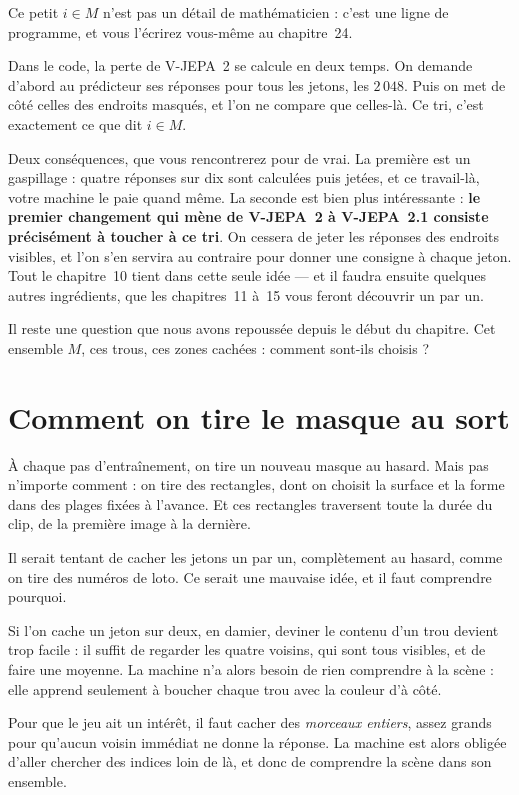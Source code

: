 \begin{enia}
Ce petit $i \in M$ n'est pas un détail de mathématicien : c'est une ligne de
programme, et vous l'écrirez vous-même au chapitre~24.

Dans le code, la perte de V-JEPA~2 se calcule en deux temps. On demande
d'abord au prédicteur ses réponses pour tous les jetons, les $2\,048$. Puis
on met de côté celles des endroits masqués, et l'on ne compare que
celles-là. Ce tri, c'est exactement ce que dit $i \in M$.

Deux conséquences, que vous rencontrerez pour de vrai. La première est un
gaspillage : quatre réponses sur dix sont calculées puis jetées, et ce
travail-là, votre machine le paie quand même. La seconde est bien plus
intéressante : \textbf{le premier changement qui mène de V-JEPA~2 à
V-JEPA~2.1 consiste précisément à toucher à ce tri}. On cessera de jeter les
réponses des endroits visibles, et l'on s'en servira au contraire pour
donner une consigne à chaque jeton. Tout le chapitre~10 tient dans cette
seule idée — et il faudra ensuite quelques autres ingrédients, que les
chapitres~11 à~15 vous feront découvrir un par un.
\end{enia}

Il reste une question que nous avons repoussée depuis le début du chapitre.
Cet ensemble $M$, ces trous, ces zones cachées : comment sont-ils choisis ?

\section{Comment on tire le masque au sort}

\begin{enclair}
À chaque pas d'entraînement, on tire un nouveau masque au hasard. Mais pas
n'importe comment : on tire des rectangles, dont on choisit la surface et la
forme dans des plages fixées à l'avance. Et ces rectangles traversent toute
la durée du clip, de la première image à la dernière.
\end{enclair}

Il serait tentant de cacher les jetons un par un, complètement au hasard,
comme on tire des numéros de loto. Ce serait une mauvaise idée, et il faut
comprendre pourquoi.

\begin{intuition}
Si l'on cache un jeton sur deux, en damier, deviner le contenu d'un trou
devient trop facile : il suffit de regarder les quatre voisins, qui sont
tous visibles, et de faire une moyenne. La machine n'a alors besoin de rien
comprendre à la scène : elle apprend seulement à boucher chaque trou avec la
couleur d'à côté.

Pour que le jeu ait un intérêt, il faut cacher des \emph{morceaux entiers},
assez grands pour qu'aucun voisin immédiat ne donne la réponse. La machine
est alors obligée d'aller chercher des indices loin de là, et donc de
comprendre la scène dans son ensemble.
\end{intuition}

